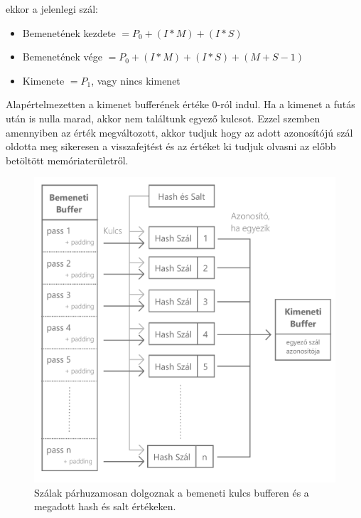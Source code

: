 ekkor a jelenlegi szál:


\begin{itemize}
    \itemsep-0.5em
    \item Bemenetének kezdete $ = P_0 + (I * M) + (I * S) $
    \item Bemenetének vége $ = P_0 + (I * M) + (I * S) + (M + S - 1) $
    \item Kimenete $ = P_1 $, vagy nincs kimenet
\end{itemize}

Alapértelmezetten a kimenet bufferének értéke 0-ról indul. Ha a kimenet a futás után is nulla marad, akkor nem találtunk egyező kulcsot. Ezzel szemben amennyiben az érték megváltozott, akkor tudjuk hogy az adott azonosítójú szál oldotta meg sikeresen a visszafejtést és az értéket ki tudjuk olvasni az előbb betöltött memóriaterületről.


\begin{figure}[H]
    \centering
    \includegraphics[width=\textwidth]{images/pdf/parallel-cracking.pdf}
    \caption{Szálak párhuzamosan dolgoznak a bemeneti kulcs bufferen és a megadott hash és salt értékeken.}
\end{figure}










